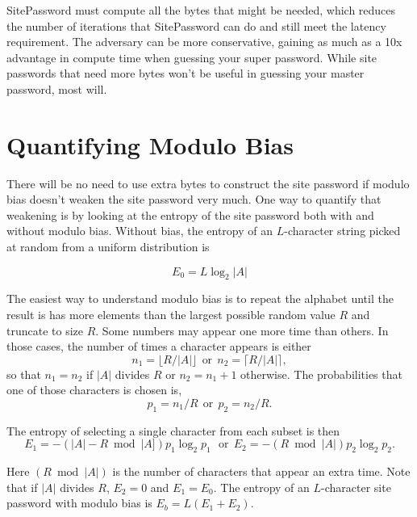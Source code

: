 \documentclass[11pt, oneside]{article}   	%
\begin{document}
 SitePassword must compute all the bytes that might be needed, which reduces the number of iterations that SitePassword can do and still meet the latency requirement.  The adversary can be more conservative, gaining as much as a 10x advantage in compute time when guessing your super password.  While site passwords that need more bytes won't be useful in guessing your master password, most will.

\section{Quantifying Modulo Bias}

There will be no need to use extra bytes to construct the site password if modulo bias doesn't weaken the site password very much.  One way to quantify that weakening is by looking at the entropy of the site password both with and without modulo bias.  Without bias, the entropy of an $L$-character string picked at random from a uniform distribution is

\begin{equation}
E_0 = L \log_2 |A|
\end{equation}

The easiest way to understand modulo bias is to repeat the alphabet until the result is has more elements than the largest possible random value $R$ and truncate to size $R$.  Some numbers may appear one more time than others.  In those cases, the number of times a character appears is either
\begin{equation}
n_1 = \lfloor R/|A| \rfloor ~~\textrm{or}~~ n_2 = \lceil R/|A| \rceil,
\end{equation}
so that $n_1 = n_2$ if $|A|$ divides $R$ or $n_2 = n_1 + 1$ otherwise.  The probabilities that one of those characters is chosen is, 
\begin{equation}
p_1 = n_1/R ~~\textrm{or}~~ p_2 = n_2/R.
\end{equation}

The entropy of selecting a single character from each subset is then
\begin{equation}
E_1 = -(|A| - R \bmod |A]) p_1 \log_2 p_1 ~~~\textrm{or}~~ E_2 = - (R \bmod |A|) p_2 \log_2 p_2.
\end{equation}

Here $(R \bmod|A|)$ is the number of characters that appear an extra time.  Note that if $|A|$ divides $R$, $E_2 = 0$ and $E_1 = E_0$.  The entropy of an $L$-character site password with modulo bias is $E_b = L(E_1 + E_2)$.  
\end{document}
